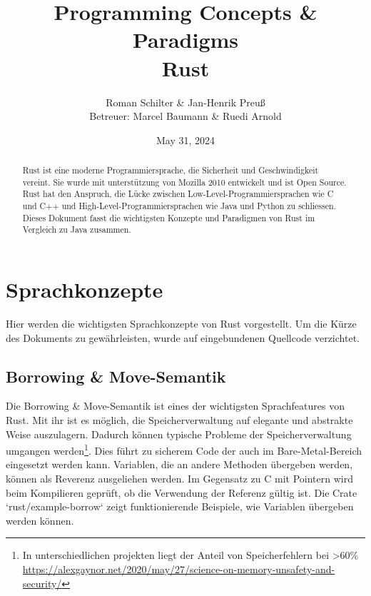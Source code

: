 \documentclass[letterpaper,12pt]{article}
\begin{document}
    \title{Programming Concepts \& Paradigms\\Rust}
    \author{Roman Schilter \& Jan-Henrik Preuß\\[0.4cm]{\small Betreuer: Marcel Baumann \& Ruedi Arnold}}
    \date{May 31, 2024}
    \maketitle


    \begin{abstract}
        Rust ist eine moderne Programmiersprache, die Sicherheit und Geschwindigkeit vereint.
        Sie wurde mit unterstützung von Mozilla 2010 entwickelt und ist Open Source.
        Rust hat den Anspruch, die Lücke zwischen Low-Level-Programmiersprachen wie C und C++ und High-Level-Programmiersprachen wie Java und Python zu schliessen.
        Dieses Dokument fasst die wichtigsten Konzepte und Paradigmen von Rust im Vergleich zu Java zusammen.
    \end{abstract}



    \section{Sprachkonzepte}

    Hier werden die wichtigsten Sprachkonzepte von Rust vorgestellt.
    Um die Kürze des Dokuments zu gewährleisten, wurde auf eingebundenen Quellcode verzichtet.

    \subsection{Borrowing \& Move-Semantik}\label{subsec:borrowing-&-move-semantik}
    Die Borrowing \& Move-Semantik ist eines der wichtigsten Sprachfeatures von Rust.
    Mit ihr ist es möglich, die Speicherverwaltung auf elegante und abstrakte Weise auszulagern.
    Dadurch können typische Probleme der Speicherverwaltung umgangen werden\footnote
    {In unterschiedlichen projekten liegt der Anteil von Speicherfehlern bei \textgreater 60\% \url{https://alexgaynor.net/2020/may/27/science-on-memory-unsafety-and-security/}}.
    Dies führt zu sicherem Code der auch im Bare-Metal-Bereich eingesetzt werden kann.
    Variablen, die an andere Methoden übergeben werden, können als Reverenz ausgeliehen werden.
    Im Gegensatz zu C mit Pointern wird beim Kompilieren geprüft, ob die Verwendung der Referenz gültig ist.
    Die Crate `rust/example-borrow` zeigt funktionierende Beispiele, wie Variablen übergeben werden können.
\end{document}
